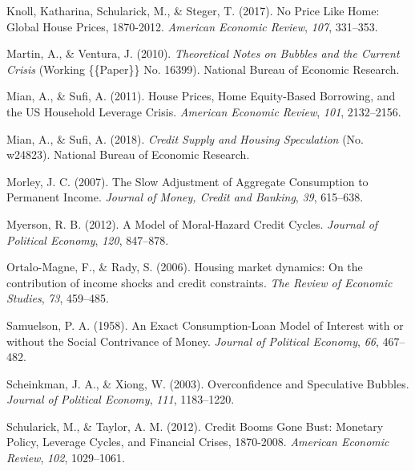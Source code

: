 \documentclass[
  12pt,
]{article}
\newlength{\cslhangindent}
\newlength{\cslentryspacingunit} %
\newenvironment{CSLReferences}[2] %
 {%
  \setlength{\parindent}{0pt}
  \ifodd #1
  \let\oldpar\par
  \def\par{\hangindent=\cslhangindent\oldpar}
  \fi
  \setlength{\parskip}{#2\cslentryspacingunit}
 }%
 {}
\begin{document}
\begin{CSLReferences}{1}{0}
\leavevmode{}%
Knoll, Katharina, Schularick, M., \& Steger, T. (2017). No {Price Like Home}: {Global House Prices}, 1870-2012. \emph{American Economic Review}, \emph{107}, 331--353.

\leavevmode{}%
Martin, A., \& Ventura, J. (2010). \emph{Theoretical {Notes} on {Bubbles} and the {Current Crisis}} (Working \{\{Paper\}\} No. 16399). {National Bureau of Economic Research}.

\leavevmode{}%
Mian, A., \& Sufi, A. (2011). House {Prices}, {Home Equity}-{Based Borrowing}, and the {US Household Leverage Crisis}. \emph{American Economic Review}, \emph{101}, 2132--2156.

\leavevmode{}%
Mian, A., \& Sufi, A. (2018). \emph{Credit {Supply} and {Housing Speculation}} (No. w24823). {National Bureau of Economic Research}.

\leavevmode{}%
Morley, J. C. (2007). The {Slow Adjustment} of {Aggregate Consumption} to {Permanent Income}. \emph{Journal of Money, Credit and Banking}, \emph{39}, 615--638.

\leavevmode{}%
Myerson, R. B. (2012). A {Model} of {Moral}-{Hazard Credit Cycles}. \emph{Journal of Political Economy}, \emph{120}, 847--878.

\leavevmode{}%
Ortalo-Magne, F., \& Rady, S. (2006). Housing market dynamics: {On} the contribution of income shocks and credit constraints. \emph{The Review of Economic Studies}, \emph{73}, 459--485.

\leavevmode{}%
Samuelson, P. A. (1958). An {Exact Consumption}-{Loan Model} of {Interest} with or without the {Social Contrivance} of {Money}. \emph{Journal of Political Economy}, \emph{66}, 467--482.

\leavevmode{}%
Scheinkman, J. A., \& Xiong, W. (2003). Overconfidence and {Speculative Bubbles}. \emph{Journal of Political Economy}, \emph{111}, 1183--1220.

\leavevmode{}%
Schularick, M., \& Taylor, A. M. (2012). Credit {Booms Gone Bust}: {Monetary Policy}, {Leverage Cycles}, and {Financial Crises}, 1870-2008. \emph{American Economic Review}, \emph{102}, 1029--1061.


\end{CSLReferences}
\end{document}
